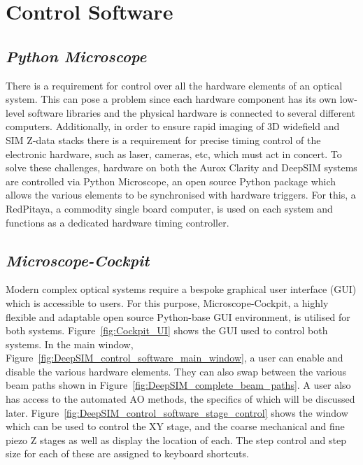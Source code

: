 \section{Control Software}
\label{sec:control_software}

\subsection{\textit{Python Microscope}}
\label{subsec:microscope}

There is a requirement for control over all the hardware elements of
an optical system. This can pose a problem since each hardware
component has its own low-level software libraries and the physical
hardware is connected to several different computers. Additionally, in
order to ensure rapid imaging of 3D widefield and SIM Z-data stacks
there is a requirement for precise timing control of the electronic
hardware, such as laser, cameras, etc, which must act in concert. To
solve these challenges, hardware on both the Aurox Clarity and DeepSIM
systems are controlled via Python Microscope, an open source Python
package which allows the various elements to be synchronised with
hardware triggers.\cite{pinto2021python} For this, a RedPitaya, a commodity single board
computer, is used on each system and
functions as a dedicated hardware timing controller.

\subsection{\textit{Microscope-Cockpit}}
\label{subsec:cockpit}

Modern complex optical systems require a bespoke graphical user interface (GUI) which is accessible to users. For this purpose, Microscope-Cockpit, a highly flexible and adaptable open source Python-base GUI environment, is utilised for both systems.\cite{phillips2021microscope} Figure~\ref{fig:Cockpit_UI} shows the GUI used to control both systems. In the main window, Figure~\ref{fig:DeepSIM_control_software_main_window}, a user can enable and disable the various hardware elements. They can also swap between the various beam paths shown in Figure~\ref{fig:DeepSIM_complete_beam_paths}. A user also has access to the automated AO methods, the specifics of which will be discussed later. Figure~\ref{fig:DeepSIM_control_software_stage_control} shows the window which can be used to control the XY stage, and the coarse mechanical and fine piezo Z stages as well as display the location of each. The step control and step size for each of these are assigned to keyboard shortcuts. 

